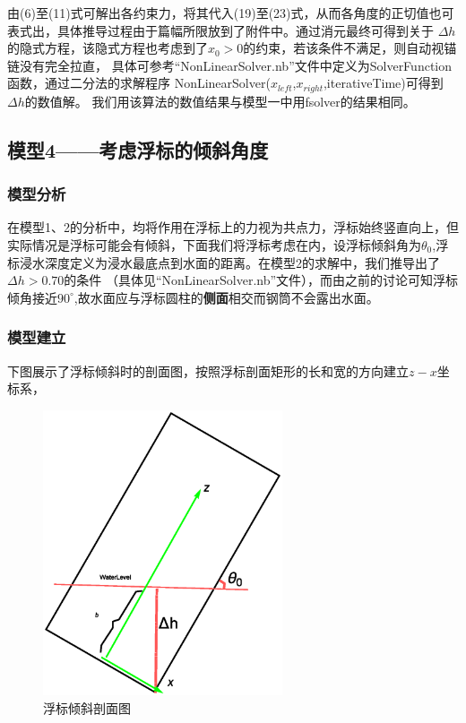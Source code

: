 \documentclass[a4paper,12pt]{ctexart}
\begin{document}
由(6)至(11)式可解出各约束力，将其代入(19)至(23)式，从而各角度的正切值也可表式出，具体推导过程由于篇幅所限放到了附件中。通过消元最终可得到关于
$\Delta h$的隐式方程，该隐式方程也考虑到了$x_0>0$的约束，若该条件不满足，则自动视锚链没有完全拉直，
具体可参考“NonLinearSolver.nb”文件中定义为SolverFunction函数，通过二分法的求解程序
NonLinearSolver($x_{left}$,$x_{right}$,iterativeTime)可得到$\Delta h$的数值解。
我们用该算法的数值结果与模型一中用fsolver的结果相同。

\subsection{模型4——考虑浮标的倾斜角度}
\subsubsection{模型分析}
在模型1、2的分析中，均将作用在浮标上的力视为共点力，浮标始终竖直向上，但实际情况是浮标可能会有倾斜，下面我们将浮标考虑在内，设浮标倾斜角为$\theta_0$,浮标浸水深度定义为浸水最底点到水面的距离。在模型2的求解中，我们推导出了$\Delta h>0.70$的条件
（具体见“NonLinearSolver.nb”文件），而由之前的讨论可知浮标倾角接近$90^{\circ}$,故水面应与浮标圆柱的\textbf{侧面}相交而钢筒不会露出水面。
\subsubsection{模型建立}
下图展示了浮标倾斜时的剖面图，按照浮标剖面矩形的长和宽的方向建立$z-x$坐标系，
\begin{figure}[!ht]
\caption{浮标倾斜剖面图}
\centering
\includegraphics[width=200pt]{MyBuoy.eps}
\end{figure}
\end{document}

